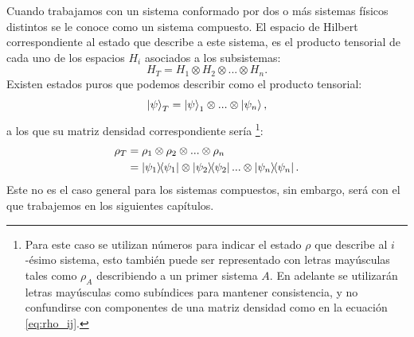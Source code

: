 \documentclass[letterpaper,12pt]{thesisECFM}
\theoremstyle{plain}
\theoremstyle{definition}
\theoremstyle{definition}
\theoremstyle{remark}
\newcommand{\1}{\mathbb{1}}
\begin{document}
Cuando trabajamos con un sistema conformado por dos o más sistemas físicos
distintos se le conoce como un sistema compuesto.  El espacio de Hilbert
correspondiente al estado que describe a este sistema, es el producto
tensorial de cada uno de los espacios $H_i$ asociados a los subsistemas: 
\begin{equation}
H_T=H_1 \otimes H_2\otimes ...\otimes H_n.
\end{equation}
 Existen estados puros que podemos describir como el producto tensorial: 
\begin{equation}
    \ket{\psi}_T = \ket{\psi}_1 \otimes ... \otimes \ket{\psi_n},
\end{equation}
a los que su matriz densidad correspondiente sería \cite{nielsen_chuang_2011}
\footnote{Para este caso se utilizan números para indicar el estado $\rho$ que
describe al $i$-ésimo sistema, esto también puede ser representado con letras
mayúsculas tales como $\rho_A$ describiendo a un primer sistema $A$. En
adelante se utilizarán letras mayúsculas como subíndices para mantener
consistencia, y no confundirse con componentes de una matriz densidad como en
la ecuación \ref{eq:rho_ij}.}: 
\begin{align}
    \rho_T  & = \rho_1 \otimes \rho_2 \otimes  ... \otimes \rho_n \\
            & = \ketbra{\psi_1} \otimes \ketbra{\psi_2} ... \otimes \ketbra{\psi_n}. 
\end{align}
Este no es el caso general para los sistemas compuestos, sin embargo, será con
el que trabajemos en los siguientes capítulos.
\end{document}
